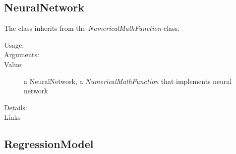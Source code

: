 \subsection{NeuralNetwork}

The class inherits from the \textit{NumericalMathFunction} class.

\begin{description}

\item[Usage:] \rule{0pt}{1em}

\item[Arguments:]  \rule{0pt}{1em}

\item[Value:] a NeuralNetwork, a \textit{NumericalMathFunction} that implements neural network

\item[Details:]  \rule{0pt}{1em}

\item[Links] \rule{0pt}{1em}
\end{description}

\subsection{RegressionModel}

